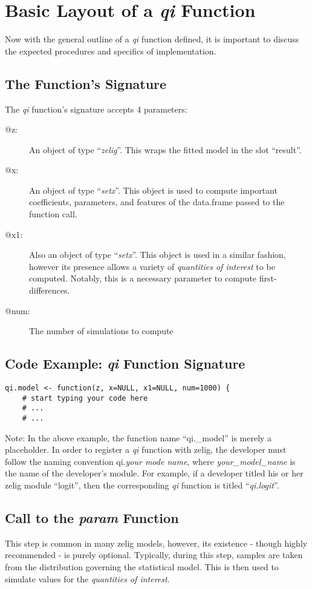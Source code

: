 \documentclass[10pt]{article}
\begin{document}
%
\section{Basic Layout of a \emph{qi} Function}
Now with the general outline of a \emph{qi} function defined, it is important to discuss the expected procedures and specifics of implementation.


\subsection{The Function's Signature}
The \emph{qi} function's signature accepts 4 parameters:


%
%
\begin{description}
	\item[@z:]{An object of type ``\emph{zelig}''.  This wraps the fitted model in the slot ``result''.}
	\item[@x:]{An object of type ``\emph{setx}''.  This object is used to compute important coefficients, parameters, and features of the data.frame passed to the function call.}
	\item[@x1:]{Also an object of type ``\emph{setx}''.  This object is used in a similar fashion, however its presence allows a variety of \emph{quantities of interest} to be computed.  Notably, this is a necessary parameter to compute first-differences.}
	\item[@num:]{The number of simulations to compute}
\end{description}


%
\subsection{Code Example: \emph{qi} Function Signature}
\begin{verbatim}
qi.model <- function(z, x=NULL, x1=NULL, num=1000) {
	# start typing your code here
	# ...
	# ...
\end{verbatim}


Note: In the above example, the function name ``qi.\_model'' is merely a placeholder.  In order to register a \emph{qi} function with zelig, the developer must follow the naming convention qi.\emph{your mode name}, where \emph{your\_model\_name} is the name of the developer's module.  For example, if a developer titled his or her zelig module ``logit'', then the corresponding \emph{qi} function is titled ``\emph{qi.logit}''.

\subsection{Call to the \emph{param} Function}
This step is common in many zelig models, however, its existence - though highly recommended - is purely optional.  Typically, during this step, samples are taken from the distribution governing the statistical model.  This is then used to simulate values for the \emph{quantities of interest}.
\end{document}
